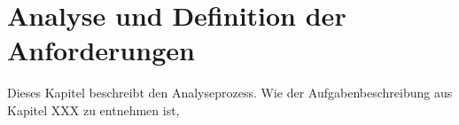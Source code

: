 \chapter{Analyse und Definition der Anforderungen } \label{kap:analyse_und_definition}

Dieses Kapitel beschreibt den Analyseprozess. Wie der Aufgabenbeschreibung aus Kapitel XXX zu entnehmen ist, 




